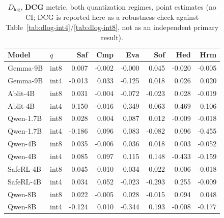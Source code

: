 \documentclass[10pt,twocolumn]{article}
\newcommand{\Dlog}{D_{\log}}
\begin{document}
\begin{table}[p]
\centering\scriptsize
\setlength{\tabcolsep}{2.6pt}
\caption{$\Dlog$, \textbf{DCG} metric, both quantization regimes, point estimates (no CI;
DCG is reported here as a robustness check against Table~\ref{tab:dlog-int4}/\ref{tab:dlog-int8},
not as an independent primary result).}
\label{tab:dlog-dcg}
\begin{tabular}{@{}llrrrrrr@{}}
\toprule
Model & $q$ & Saf & Cmp & Eva & Sof & Hed & Hrm \\
\midrule
Gemma-9B  & int8 &  0.007 & -0.002 & -0.000 &  0.045 & -0.020 & -0.005 \\
Gemma-9B  & int4 & -0.013 &  0.033 & -0.125 &  0.018 &  0.026 &  0.020 \\
Ablit-4B  & int8 &  0.031 & -0.004 & -0.072 & -0.023 &  0.028 & -0.019 \\
Ablit-4B  & int4 &  0.150 & -0.016 &  0.349 &  0.063 &  0.469 &  0.106 \\
Qwen-1.7B & int8 &  0.028 &  0.004 &  0.087 &  0.012 & -0.009 & -0.018 \\
Qwen-1.7B & int4 & -0.186 &  0.096 &  0.083 & -0.082 &  0.096 & -0.455 \\
Qwen-4B   & int8 &  0.035 & -0.006 &  0.036 &  0.018 &  0.003 & -0.052 \\
Qwen-4B   & int4 &  0.085 &  0.097 &  0.115 &  0.148 & -0.433 & -0.159 \\
SafeRL-4B & int8 &  0.045 & -0.010 & -0.034 &  0.022 &  0.006 & -0.018 \\
SafeRL-4B & int4 &  0.034 &  0.052 & -0.023 & -0.293 &  0.255 & -0.009 \\
Qwen-8B   & int8 &  0.022 & -0.005 &  0.028 & -0.015 &  0.094 &  0.048 \\
Qwen-8B   & int4 & -0.124 &  0.010 & -0.344 &  0.193 & -0.008 & -0.177 \\
\bottomrule
\end{tabular}
\end{table}
\end{document}
